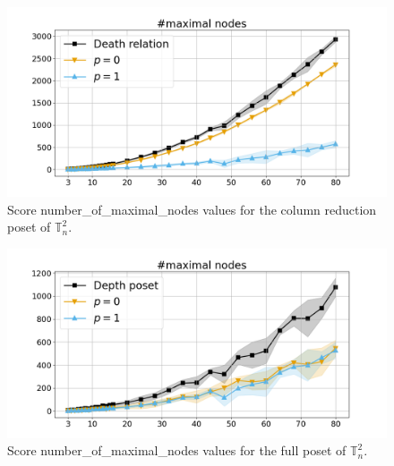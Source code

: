 \documentclass{article}
\begin{document}
    \begin{figure}[h!]
        \centering
        \hspace*{-0.24\textwidth}
        \includegraphics[width=1.4\textwidth]{pics/extended torus scores/score=number-of-maximal-nodes, dim=2, object=column reduction.png}
        \caption{Score number\_of\_maximal\_nodes values for the column reduction poset of $\mathbb{T}_n^{2}$.}
        \label{fig:numberofmaximalnodes-columnreduction2}
    \end{figure}
    \begin{figure}[h!]
        \centering
        \hspace*{-0.24\textwidth}
        \includegraphics[width=1.4\textwidth]{pics/extended torus scores/score=number-of-maximal-nodes, dim=2, object=full.png}
        \caption{Score number\_of\_maximal\_nodes values for the full poset of $\mathbb{T}_n^{2}$.}
        \label{fig:numberofmaximalnodes-full2}
    \end{figure}
\end{document}
